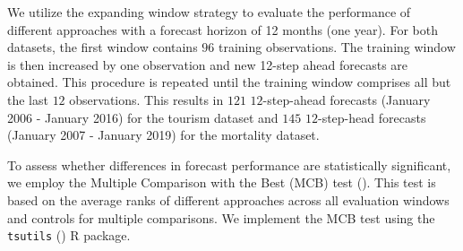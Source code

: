 \documentclass[a4paper,review,12pt,authoryear]{elsarticle}
\let\code=\texttt
\begin{document}

We utilize the expanding window strategy to evaluate the performance of different approaches with a forecast horizon of 12 months (one year). For both datasets, the first window contains $96$ training observations. The training window is then increased by one observation and new 12-step ahead forecasts are obtained. This procedure is repeated until the training window comprises all but the  last $12$ observations. This results in $121$ $12$-step-ahead forecasts (January 2006 - January 2016) for the tourism dataset and $145$ $12$-step-head forecasts (January 2007 - January 2019) for the mortality dataset. %

To assess whether differences in forecast performance are statistically significant, we employ the Multiple Comparison with the Best (MCB) test (\citealp{koningM3CompetitionStatistical2005}). This test is based on the average ranks of different approaches across all evaluation windows and controls for multiple comparisons. {\color{purple} We implement the MCB test using the \code{tsutils} (\citealp{tsuitls}) R package}.

    
\end{document}
